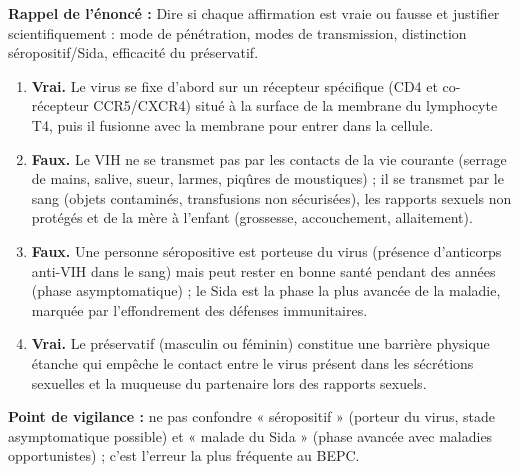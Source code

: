 \documentclass[11pt]{article}
\newcommand{\cle}[1]{{\popxbold\color{popdark}#1}}
\begin{document}
\begin{corrige}
\textbf{Rappel de l'énoncé :} Dire si chaque affirmation est vraie ou fausse et justifier scientifiquement : mode de pénétration, modes de transmission, distinction séropositif/Sida, efficacité du préservatif.
\tcblower
\begin{enumerate}
\item \textbf{Vrai.} Le virus se fixe d'abord sur un récepteur spécifique (CD4 et co-récepteur CCR5/CXCR4) situé à la surface de la membrane du lymphocyte T4, puis il fusionne avec la membrane pour entrer dans la cellule.
\item \textbf{Faux.} Le VIH ne se transmet pas par les contacts de la vie courante (serrage de mains, salive, sueur, larmes, piqûres de moustiques) ; il se transmet par le sang (objets contaminés, transfusions non sécurisées), les rapports sexuels non protégés et de la mère à l'enfant (grossesse, accouchement, allaitement).
\item \textbf{Faux.} Une personne \cle{séropositive} est porteuse du virus (présence d'anticorps anti-VIH dans le sang) mais peut rester en bonne santé pendant des années (phase asymptomatique) ; le Sida est la phase la plus avancée de la maladie, marquée par l'effondrement des défenses immunitaires.
\item \textbf{Vrai.} Le préservatif (masculin ou féminin) constitue une barrière physique étanche qui empêche le contact entre le virus présent dans les sécrétions sexuelles et la muqueuse du partenaire lors des rapports sexuels.
\end{enumerate}
\textbf{Point de vigilance :} ne pas confondre « séropositif » (porteur du virus, stade asymptomatique possible) et « malade du Sida » (phase avancée avec maladies opportunistes) ; c'est l'erreur la plus fréquente au BEPC.
\end{corrige}
\end{document}

